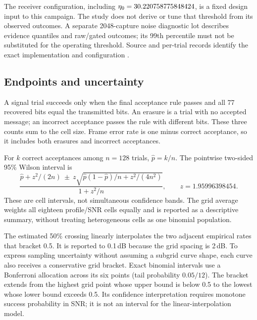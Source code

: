 The receiver configuration, including $\eta_0=30.220758775848424$, is a fixed design
input to this campaign. The study does not derive or tune that threshold
from its observed outcomes. A separate 2048-capture noise diagnostic lot
describes evidence quantiles and raw/gated outcomes; its 99th percentile
must not be substituted for the operating threshold. Source and per-trial
records identify the exact implementation and configuration \cite{study}.

\subsection{Endpoints and uncertainty}

A signal trial succeeds only when the final acceptance rule passes and all
77 recovered bits equal the transmitted bits. An erasure is a trial with no
accepted message; an incorrect acceptance passes the rule with different
bits. These three counts sum to the cell size. Frame error rate is one minus
correct acceptance, so it includes both erasures and incorrect acceptances.

For $k$ correct acceptances among $n=128$ trials, $\widehat p=k/n$.
The pointwise two-sided 95\% Wilson interval \cite{wilson} is
\begin{equation}
 \frac{\widehat p+z^2/(2n)\ \pm\
 z\sqrt{\widehat p(1-\widehat p)/n+z^2/(4n^2)}}{1+z^2/n},
 \qquad z=1.95996398454.
 \label{eq:wilson}
\end{equation}
These are cell intervals, not simultaneous confidence bands. The grid
average weights all eighteen profile/SNR cells equally and is reported as
a descriptive summary, without treating heterogeneous cells as one binomial
population.

The estimated 50\% crossing linearly interpolates the two adjacent empirical
rates that bracket 0.5. It is reported to 0.1\,dB because the grid spacing is
2\,dB. To express sampling uncertainty without assuming a subgrid curve
shape, each curve also receives a conservative grid bracket. Exact binomial
intervals use a Bonferroni allocation across its six points (tail probability
$0.05/12$). The bracket extends from the highest grid point whose upper
bound is below 0.5 to the lowest whose lower bound exceeds 0.5. Its confidence
interpretation requires monotone success probability in SNR; it is not an
interval for the linear-interpolation model.


